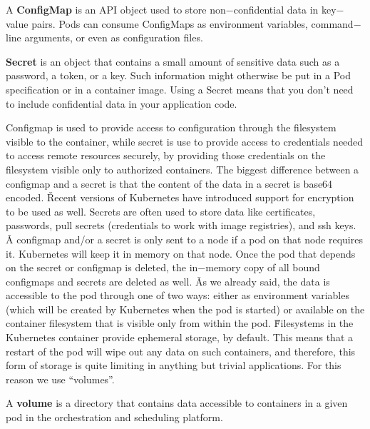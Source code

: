 \bd[ConfigMap]
A \textbf{ConfigMap} is an API object used to store non$-$confidential data in key$-$value pairs. Pods can consume
ConfigMaps as environment variables, command$-$line arguments, or even as configuration files.
\ed

\bd[Secret]
\textbf{Secret} is an object that contains a small amount of sensitive data such as a password, a token, or a key. Such
information might otherwise be put in a Pod specification or in a container image. Using a Secret means that you don't
need to include confidential data in your application code.
\ed


Configmap is used to provide access to configuration through the filesystem visible to the container, while secret is
use to provide access to credentials needed to access remote resources securely, by providing those credentials on
the filesystem visible only to authorized containers. The biggest difference between a configmap and a secret is that
the content of the data in a secret is base64 encoded. \v

Recent versions of Kubernetes have introduced support for encryption
to be used as well. Secrets are often used to store data like certificates, passwords, pull secrets (credentials to work
with image registries), and ssh keys. \v

A configmap and/or a secret is only sent to a node if a pod on that node requires it. Kubernetes will keep it in
memory on that node. Once the pod that depends on the secret or configmap is deleted, the in$-$memory copy of all
bound configmaps and secrets are deleted as well. \v

As we already said, the data is accessible to the pod through one of two ways: either as environment variables (which
will be created by Kubernetes when the pod is started) or available on the container filesystem that is visible only
from within the pod. \v

Filesystems in the Kubernetes container provide ephemeral storage, by default. This means that a restart of the pod
will wipe out any data on such containers, and therefore, this form of storage is quite limiting in anything but
trivial applications. For this reason we use ``volumes''.

\bd[Volume]
A \textbf{volume} is a directory that contains data accessible to containers in a given pod in the orchestration and
scheduling platform.
\ed


